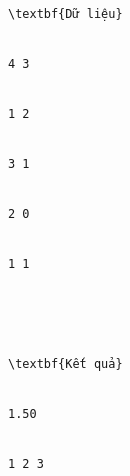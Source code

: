 \begin{verbatim}
\textbf{Dữ liệu}


4 3


1 2


3 1


2 0


1 1





\textbf{Kết quả}


1.50


1 2 3


\end{verbatim}